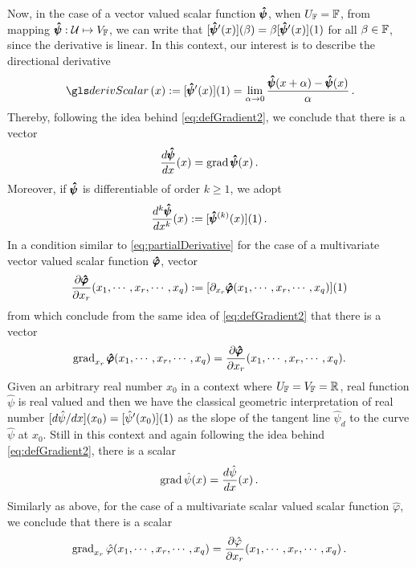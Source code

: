 Now, in the case of a vector valued scalar function $\pmb{\hat{\psi}}$, when $U_{\mathbb{F}}=\mathbb{F}$, from mapping $\pmb{\hat{\psi}} : \mathcal{U} \mapsto V_{\mathbb{F}}$, we can write that $[\pmb{\hat{\psi}}'(x)](\beta) = \beta[\pmb{\hat{\psi}}'(x)](1)$ for all $\beta\in\mathbb{F}$, since the derivative is linear. In this context, our interest is to describe the directional derivative  
\begin{equation}\label{eq:derivVecScaFun}
\fua{\gloref{derivScalar}}{x} := \fua{[\tnr{\hat{\psi}}'(x)]}{1} = \lim_{\alpha\to 0} \dfrac{\fua{\tnr{\hat{\psi}}}{x+\alpha}-\fua{\tnr{\hat{\psi}}}{x}}{\alpha}\,. 
\end{equation} 
Thereby, following the idea behind \eqref{eq:defGradient2}, we conclude that there is a vector
\begin{equation}\label{eq:gradvectFun}
\dfrac{d\pmb{\hat{\psi}}}{dx}(x) = \operatorname{grad}{\pmb{\hat{\psi}}}(x) \,.
\end{equation}
Moreover, if $\pmb{\hat{\psi}}$ is differentiable of order $k\geqslant 1$, we adopt  
\begin{equation}
\dfrac{d^k\pmb{\hat{\psi}}}{dx^k}(x):=[\pmb{\hat{\psi}}^{(k)}(x)](1)\,.
\end{equation} 
In a condition similar to \eqref{eq:partialDerivative} for the case of a multivariate vector valued scalar function $\pmb{\hat{\varphi}}$, vector
\begin{equation}
\dfrac{\partial\pmb{\hat{\varphi}}}{\partial x_r}(x_1,\cdots,x_r,\cdots,x_q) := [\partial_{x_r}\pmb{\hat{\varphi}}(x_1,\cdots,x_r,\cdots,x_q)](1)
\end{equation}
from which conclude from the same idea of \eqref{eq:defGradient2} that there is a vector 
\begin{equation}
\operatorname{grad}_{x_r}{\pmb{\hat{\varphi}}}(x_1,\cdots,x_r,\cdots,x_q)=\dfrac{\partial\pmb{\hat{\varphi}}}{\partial x_r}(x_1,\cdots,x_r,\cdots,x_q).
\end{equation}
Given an arbitrary real number $x_0$ in a context where $U_{\mathbb{F}}=V_{\mathbb{F}}=\mathbb{R}$, real function $\hat{\psi}$ is real valued and then we have the classical geometric interpretation of real number $[d{\hat{\psi}}/dx](x_0)=[{\hat{\psi}}'(x_0)](1)$ as the slope of the tangent line ${\hat{\psi}}_\mathit{d}$ to the curve ${\hat{\psi}}$ at $x_0$. Still in this context and again following the idea behind \eqref{eq:defGradient2}, there is a scalar
\begin{equation}
\operatorname{grad}{{\hat{\psi}}(x)}=\dfrac{d{\hat{\psi}}}{dx}(x)\,.
\end{equation}
Similarly as above, for the case of a multivariate scalar valued scalar function $\hat{\varphi}$, we conclude that there is a scalar
\begin{equation}
\operatorname{grad}_{x_r}{{\hat{\varphi}}}(x_1,\cdots,x_r,\cdots,x_q)=\dfrac{\partial{\hat{\varphi}}}{\partial x_r}(x_1,\cdots,x_r,\cdots,x_q)\,.
\end{equation}

